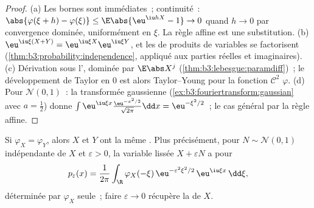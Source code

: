\begin{proof}
(a) Les bornes sont immédiates~; continuité~:
$\abs{\varphi(\xi + h) - \varphi(\xi)} \leq
\E\abs{\eu^{\iu hX} - 1} \to 0$ quand $h \to 0$ par
convergence dominée, uniformément en $\xi$. La règle affine
est une substitution. (b) $\eu^{\iu\xi(X+Y)} =
\eu^{\iu\xi X}\eu^{\iu\xi Y}$, et les  de produits
de variables  se factorisent
(\cref{thm:b3:probability:independence}, appliqué aux
parties réelles et imaginaires). (c) Dérivation sous
l', dominée par $\E\abs X^j$
(\cref{thm:b3:lebesgue:paramdiff})~; le développement de
Taylor en $0$ est alors Taylor--Young pour la fonction
$\mathcal C^2$ $\varphi$. (d) Pour $\mathcal N(0,1)$~: la
transformée gaussienne
(\cref{ex:b3:fouriertransform:gaussian} avec $a = \frac12$)
donne $\int\eu^{\iu\xi x}\frac{\eu^{-x^2/2}}{\sqrt{2\pi}}\dd
x = \eu^{-\xi^2/2}$~; le cas général par la règle affine.
\end{proof}
\begin{theorem}[Injectivité]\label{thm:b3:clt:injectivity}
Si $\varphi_X = \varphi_Y$, alors $X$ et $Y$ ont la même
. Plus précisément, pour $N \sim \mathcal N(0,1)$
indépendante de $X$ et $\varepsilon > 0$, la variable lissée
$X + \varepsilon N$ a pour 
\[
p_\varepsilon(x) = \frac1{2\pi}\int_\R
\varphi_X(-\xi)\,\eu^{-\varepsilon^2\xi^2/2}\,
\eu^{\iu\xi x}\,\dd\xi ,
\]
déterminée par $\varphi_X$ seule~; faire $\varepsilon \to 0$
récupère la  de $X$.
\end{theorem}


